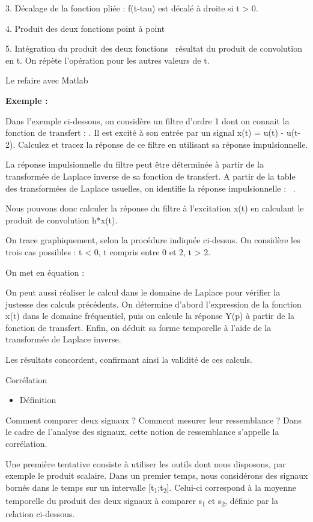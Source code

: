 \documentclass[]{article}
\begin{document}
3. Décalage de la fonction pliée : f(t-tau) est décalé à droite si t
\textgreater{} 0.

4. Produit des deux fonctions point à point

5. Intégration du produit des deux fonctions~ résultat du produit de
convolution en t. On répète l'opération pour les autres valeurs de t.

Le refaire avec Matlab

\textbf{Exemple :~}

Dans l'exemple ci-dessous, on considère un filtre d'ordre 1 dont on
connait la fonction de transfert : . Il est excité à son entrée par un
signal x(t) = u(t) - u(t-2). Calculez et tracez la réponse de ce filtre
en utilisant sa réponse impulsionnelle.

La réponse impulsionnelle du filtre peut être déterminée à partir de la
transformée de Laplace inverse de sa fonction de transfert. A partir de
la table des transformées de Laplace usuelles, on identifie la réponse
impulsionnelle :~ .

Nous pouvons donc calculer la réponse du filtre à l'excitation x(t) en
calculant le produit de convolution h*x(t).

On trace graphiquement, selon la procédure indiquée ci-dessus. On
considère les trois cas possibles : t \textless{} 0, t compris entre 0
et 2, t \textgreater{} 2.~

On met en équation :

On peut aussi réaliser le calcul dans le domaine de Laplace pour
vérifier la justesse des calculs précédents. On détermine d'abord
l'expression de la fonction x(t) dans le domaine fréquentiel, puis on
calcule la réponse Y(p) à partir de la fonction de transfert. Enfin, on
déduit sa forme temporelle à l'aide de la transformée de Laplace
inverse.

Les résultats concordent, confirmant ainsi la validité de ces calculs.

Corrélation

\begin{itemize}
\itemsep1pt\parskip0pt
\item
  Définition
\end{itemize}

Comment comparer deux signaux ? Comment mesurer leur ressemblance ? Dans
le cadre de l'analyse des signaux, cette notion de ressemblance
s'appelle la corrélation.~

Une première tentative consiste à utiliser les outils dont nous
disposons, par exemple le produit scalaire. Dans un premier temps, nous
considérons des signaux bornés dans le temps sur un intervalle
{[}t\textsubscript{1};t\textsubscript{2}{]}. Celui-ci correspond à la
moyenne temporelle du produit des deux signaux à comparer
s\textsubscript{1} et s\textsubscript{2}, définie par la relation
ci-dessous.
\end{document}

